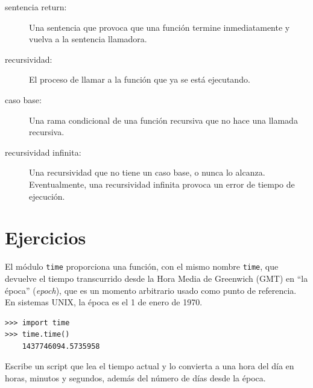 \documentclass[10pt]{book}
\begin{document}
\begin{description}
\item[sentencia return:] Una sentencia que provoca que una función
termine inmediatamente y vuelva a la sentencia llamadora.

\item[recursividad:]  El proceso de llamar a la función que ya se está
ejecutando.

\item[caso base:]  Una rama condicional de una
función recursiva que no hace una llamada recursiva.

\item[recursividad infinita:]  Una recursividad que no tiene un
caso base, o nunca lo alcanza.  Eventualmente, una recursividad infinita
provoca un error de tiempo de ejecución.

\end{description}

\section{Ejercicios}

\begin{exercise}

El módulo {\tt time} proporciona una función, con el mismo nombre {\tt time}, que
devuelve el tiempo transcurrido desde la Hora Media de Greenwich (GMT) en ``la época'' ({\em epoch}), que es
un momento arbitrario usado como punto de referencia.  En sistemas UNIX, la
época es el 1 de enero de 1970.

\begin{verbatim}
>>> import time
>>> time.time()
    1437746094.5735958
\end{verbatim}

Escribe un script que lea el tiempo actual y lo convierta a
una hora del día en horas, minutos y segundos, además del número de
días desde la época.

\end{exercise}
\end{document}
